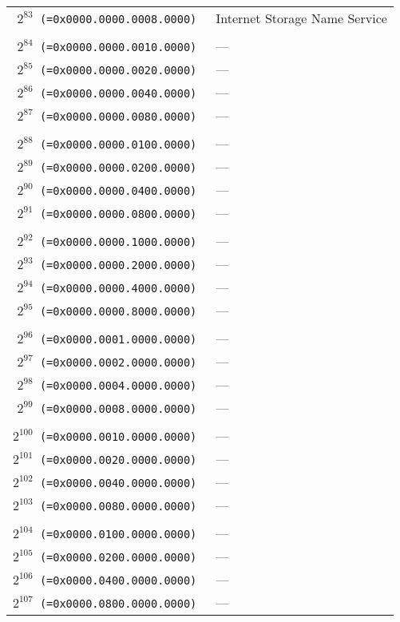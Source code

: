 \documentclass[documentation]{subfiles}
\begin{document}
\begin{small}
\begin{longtable}{>{\tt}rl}
        $2^{83}$  (=0x0000.0000.0008.0000) & Internet Storage Name Service \\
        \\
        $2^{84}$  (=0x0000.0000.0010.0000) & ---\\
        $2^{85}$  (=0x0000.0000.0020.0000) & ---\\
        $2^{86}$  (=0x0000.0000.0040.0000) & ---\\
        $2^{87}$  (=0x0000.0000.0080.0000) & ---\\
        \\
        $2^{88}$  (=0x0000.0000.0100.0000) & ---\\
        $2^{89}$  (=0x0000.0000.0200.0000) & ---\\
        $2^{90}$  (=0x0000.0000.0400.0000) & ---\\
        $2^{91}$  (=0x0000.0000.0800.0000) & ---\\
        \\
        $2^{92}$  (=0x0000.0000.1000.0000) & ---\\
        $2^{93}$  (=0x0000.0000.2000.0000) & ---\\
        $2^{94}$  (=0x0000.0000.4000.0000) & ---\\
        $2^{95}$  (=0x0000.0000.8000.0000) & ---\\
        \\
        $2^{96}$  (=0x0000.0001.0000.0000) & ---\\
        $2^{97}$  (=0x0000.0002.0000.0000) & ---\\
        $2^{98}$  (=0x0000.0004.0000.0000) & ---\\
        $2^{99}$  (=0x0000.0008.0000.0000) & ---\\
        \\
        $2^{100}$ (=0x0000.0010.0000.0000) & ---\\
        $2^{101}$ (=0x0000.0020.0000.0000) & ---\\
        $2^{102}$ (=0x0000.0040.0000.0000) & ---\\
        $2^{103}$ (=0x0000.0080.0000.0000) & ---\\
        \\
        $2^{104}$ (=0x0000.0100.0000.0000) & ---\\
        $2^{105}$ (=0x0000.0200.0000.0000) & ---\\
        $2^{106}$ (=0x0000.0400.0000.0000) & ---\\
        $2^{107}$ (=0x0000.0800.0000.0000) & ---\\

\end{longtable}
\end{small}
\end{document}

